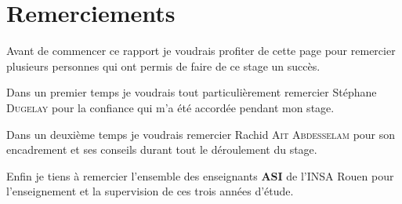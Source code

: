 \chapter*{Remerciements}

\vspace{30mm} 

\begin{center}
Avant de commencer ce rapport je voudrais profiter de cette page pour remercier plusieurs personnes qui ont permis de faire de ce stage un succès.\\
\end{center}
\vspace{5mm}

\begin{center}
Dans un premier temps je voudrais tout particulièrement remercier Stéphane \textsc{Dugelay} pour la confiance qui m'a été accordée pendant mon stage.\\
\end{center}
\vspace{5mm}

\begin{center}
Dans un deuxième temps je voudrais remercier Rachid \textsc{Ait Abdesselam} pour son encadrement et ses conseils durant tout le déroulement du stage.\\

\end{center}
\vspace{5mm}

\begin{center}
Enfin je tiens à remercier l'ensemble des enseignants \textbf{ASI} de l'INSA Rouen pour l'enseignement et la supervision de ces trois années d'étude.\\
\end{center}
\vspace{5mm}